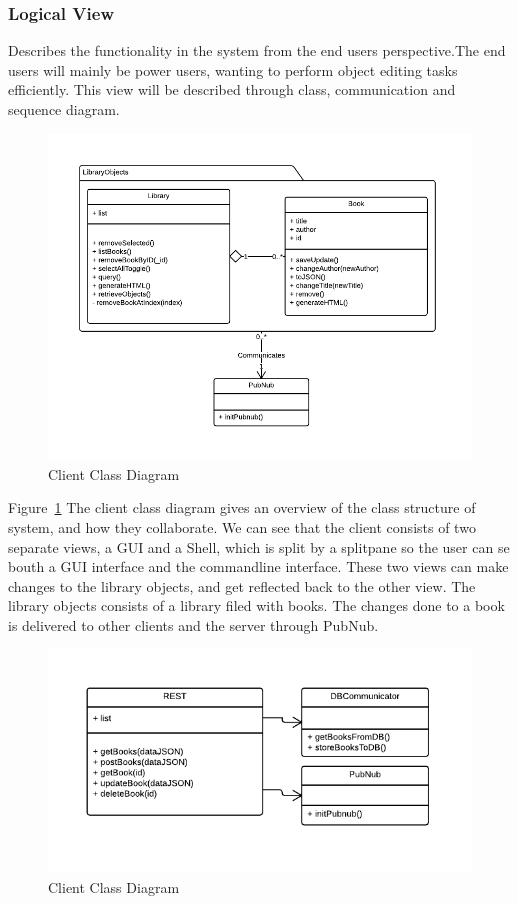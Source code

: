 \subsubsection{Logical View}
Describes the functionality in the system from the end users perspective.The end users will mainly be power users, wanting to perform object editing tasks efficiently. This view will be described through class, communication and sequence diagram.

\begin{figure}[h]
\centering
\includegraphics[width=6in]{image/architecture/s1/s1clientClassDiagram.png}
\caption{Client Class Diagram}
\label{figure:s1clientClassDiagram}
\end{figure}

Figure~\ref{figure:s1clientClassDiagram} The client class diagram gives an overview of the class structure of system, and how they collaborate. We can see that the client consists of two separate views, a GUI and a Shell, which is split by a splitpane so the user can se bouth a GUI interface and the commandline interface. These two views can make changes to the library objects, and get reflected back to the other view. The library objects consists of a library filed with books. The changes done to a book is delivered to other clients and the server through PubNub. 

\begin{figure}[h]
\centering
\includegraphics[width=5in]{image/architecture/s1/s1serverClassDiagram.png}
\caption{Client Class Diagram}
\label{figure:s1serverClassDiagram}
\end{figure}

